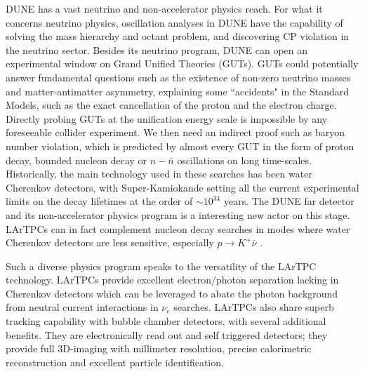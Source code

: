 DUNE has a vast neutrino and non-accelerator physics reach. For what it concerns neutrino physics, oscillation analyses in DUNE have the capability of solving the mass hierarchy and octant problem,  and discovering CP violation in the neutrino sector. Besides its neutrino program, DUNE can open an experimental window on Grand Unified Theories (GUTs). GUTs could potentially answer fundamental questions such as the existence of non-zero neutrino masses and matter-antimatter asymmetry, explaining some ``accidents" in the Standard Models, such as the exact cancellation of the  proton and the electron charge.   Directly probing GUTs at the unification energy scale is impossible by any foreseeable collider experiment. We then need an indirect proof such as baryon number violation, which is predicted by almost every GUT in the form of proton decay, bounded nucleon decay or $n-\bar n$ oscillations on long time-scales. Historically, the main technology used in these searches has been water Cherenkov detectors, with Super-Kamiokande setting all the current experimental limits on the decay lifetimes at the order of $\sim 10 ^{34}$ years. The DUNE far detector and its non-accelerator physics program is a interesting new actor on this stage.  LArTPCs can in fact complement nucleon decay searches in modes where water Cherenkov detectors are less sensitive, especially $p\rightarrow K^+\bar{\nu}$  \cite{Adams:2013qkq}.


Such a diverse physics program speaks to the versatility of the LArTPC technology. LArTPCs provide excellent electron/photon separation \cite{Acciarri:2016sli} lacking in Cherenkov detectors which can be leveraged to abate the photon background from neutral current interactions  in $\nu_e$ searches. LArTPCs also share superb tracking capability with bubble chamber detectors, with several additional benefits. They are electronically read out and self triggered detectors; they provide full 3D-imaging with millimeter resolution, precise calorimetric reconstruction and excellent particle identification. %

